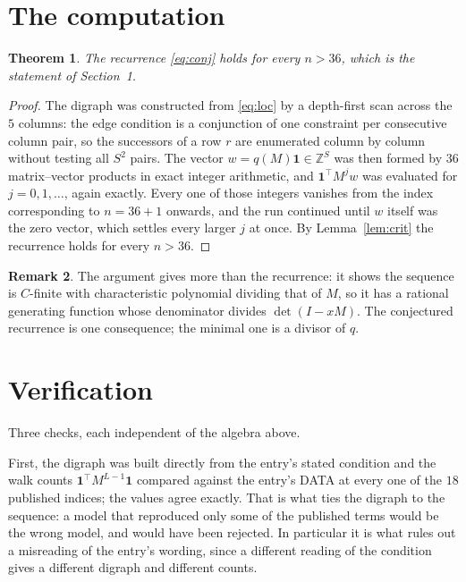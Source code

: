 \documentclass[11pt,a4paper]{article}
\theoremstyle{plain}
\newtheorem{theorem}{Theorem}
\theoremstyle{definition}
\newtheorem{remark}[theorem]{Remark}
\begin{document}
\section{The computation}

\begin{theorem}
The recurrence \eqref{eq:conj} holds for every $n>36$, which is the statement of
Section~1.
\end{theorem}

\begin{proof}
The digraph was constructed from \eqref{eq:loc} by a depth-first scan across the $5$
columns: the edge condition is a conjunction of one constraint per consecutive column
pair, so the successors of a row $r$ are enumerated column by column without testing all
$S^2$ pairs. The vector $w=q(M)\mathbf{1}\in\mathbb{Z}^{S}$ was then formed by $36$
matrix--vector products in exact integer arithmetic, and $\mathbf{1}^{\!\top}M^{j}w$ was
evaluated for $j=0,1,\dots$, again exactly. Every one of those integers vanishes from the
index corresponding to $n=36+1$ onwards, and the run continued until $w$ itself was the
zero vector, which settles every larger $j$ at once. By Lemma~\ref{lem:crit} the recurrence
holds for every $n>36$.
\end{proof}

\begin{remark}
The argument gives more than the recurrence: it shows the sequence is $C$-finite with
characteristic polynomial dividing that of $M$, so it has a rational generating function
whose denominator divides $\det(I-xM)$. The conjectured recurrence is one consequence; the
minimal one is a divisor of $q$.
\end{remark}

\section{Verification}

Three checks, each independent of the algebra above.

First, the digraph was built directly from the entry's stated condition and the walk counts
$\mathbf{1}^{\!\top}M^{L-1}\mathbf{1}$ compared against the entry's DATA at
every one of the $18$ published indices; the values agree exactly. That is what ties
the digraph to the sequence: a model that reproduced only some of the published terms would
be the wrong model, and would have been rejected. In particular it is what rules out a
misreading of the entry's wording, since a different reading of the condition gives a
different digraph and different counts.
\end{document}
